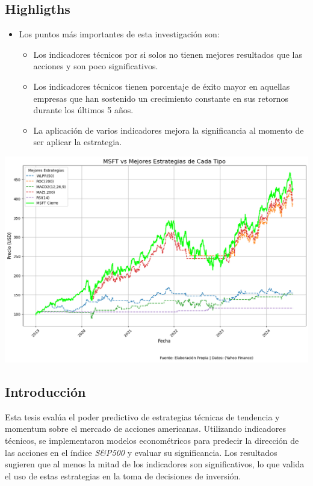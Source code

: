\documentclass[a0,portrait]{a0poster}
\newcommand{\customsection}[1]{
    \begin{center}
        \begin{tcolorbox}[colframe=miRojo!50, colback=miRojo, width=\linewidth, boxrule=1mm, arc=3mm, auto outer arc]
            \centering
            \vspace{.5cm} %
            \color{white}
            \section*{ \textbf{\Huge #1}}  %
            \vspace{.2cm} %
        \end{tcolorbox}
    \end{center}
}
\begin{document}
\begin{multicols}{2}
    \customsection{Highligths}
    
    \begin{multicols}{2}
            \begin{itemize}
                \item Los puntos más importantes de esta investigación son:
                \begin{itemize}
                    \item Los indicadores técnicos por si solos no tienen mejores resultados que las acciones y son poco significativos.
                    \item Los indicadores técnicos tienen porcentaje de éxito mayor en aquellas empresas que han sostenido un crecimiento constante en sus retornos durante los últimos 5 años.
                    \item La aplicación de varios indicadores mejora la significancia al momento de ser aplicar la estrategia.
                    
                \end{itemize}
            \end{itemize}
            \columnbreak
    \begin{minipage}{\linewidth}
        \centering
        \includegraphics[width=0.9\linewidth]{grafico_mejores_estrategias_MSFT.png}
        
        \end{minipage}
       
        \end{multicols}
    \customsection{Introducción}
    \par
    \normalsize
    Esta tesis evalúa el poder predictivo de estrategias técnicas de tendencia y momentum sobre el mercado de acciones americanas.
     Utilizando indicadores técnicos, se implementaron modelos econométricos para predecir la dirección de las acciones en el 
     índice \textit{S\&P500} y evaluar su significancia. Los resultados sugieren que al menos la mitad de los indicadores son significativos, lo que valida el uso 
     de estas estrategias en la toma de decisiones de inversión.
    

\end{multicols}
\end{document}
